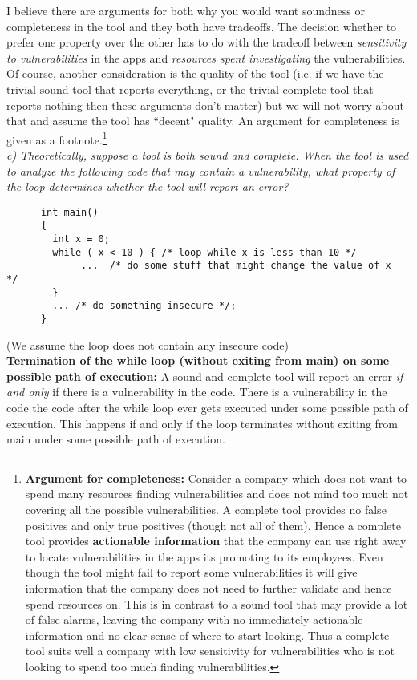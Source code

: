 I believe there are arguments for both why you would want soundness or completeness in the tool and they both have tradeoffs. The decision whether to prefer one property over the other has to do with the tradeoff between \textit{sensitivity to vulnerabilities} in the apps and \textit{resources spent investigating} the vulnerabilities. Of course, another consideration is the quality of the tool (i.e. if we have the trivial sound tool that reports everything, or the trivial complete tool that reports nothing then these arguments don't  matter) but we will not worry about that and assume the tool has ``decent" quality. An argument for completeness is given as a footnote.\footnote{\textbf{Argument for completeness: } Consider a company which does not want to spend many resources finding vulnerabilities and does not mind too much not covering all the possible vulnerabilities. A complete tool provides no false positives and only true positives (though not all of them). Hence a complete tool provides \textbf{actionable information} that the company can use right away to locate vulnerabilities in the apps its promoting to its employees. Even though the tool might fail to report some vulnerabilities it will give information that the company does not need to further validate and hence spend resources on. This is in contrast to a sound tool that may provide a lot of false alarms, leaving the company with no immediately actionable information and no clear sense of where to start looking. Thus a complete tool suits well a company with low sensitivity for vulnerabilities who is not looking to spend too much finding vulnerabilities.}\\

\noindent \textit{c) Theoretically, suppose a tool is both sound and complete. When the tool is used to analyze the following code that may contain a vulnerability, what property of the loop determines whether the tool will report an error?}
\begin{verbatim}
      int main()
      { 
        int x = 0;  
        while ( x < 10 ) { /* loop while x is less than 10 */
             ...  /* do some stuff that might change the value of x  */
        }
        ... /* do something insecure */;
      }      
\end{verbatim}
\noindent (We assume the loop does not contain any insecure code)\\

\noindent \textbf{Termination of the while loop (without exiting from main) on some possible path of execution: } A sound and complete tool will report an error \textit{if and only} if there is a vulnerability in the code. There is a vulnerability in the code  the code after the while loop ever gets executed under some possible path of execution. This happens if and only if the loop terminates without exiting from main under some possible path of execution.

